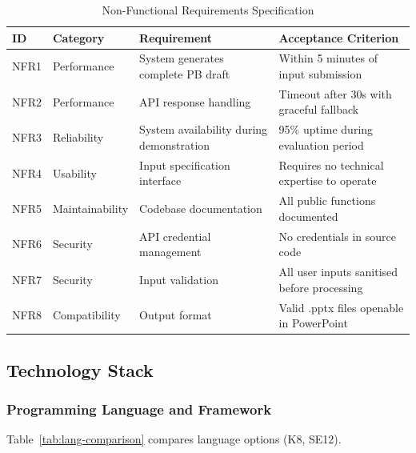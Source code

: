 \begin{table}[H]
\centering
\begin{tabular}{|l|l|l|l|}
\hline
\rowcolor{gray!20} \textbf{ID} & \textbf{Category} & \textbf{Requirement} & \textbf{Acceptance Criterion} \\
\hline
NFR1 & Performance & System generates complete PB draft & Within 5 minutes of input submission \\
\hline
NFR2 & Performance & API response handling & Timeout after 30s with graceful fallback \\
\hline
NFR3 & Reliability & System availability during demonstration & 95\% uptime during evaluation period \\
\hline
NFR4 & Usability & Input specification interface & Requires no technical expertise to operate \\
\hline
NFR5 & Maintainability & Codebase documentation & All public functions documented \\
\hline
NFR6 & Security & API credential management & No credentials in source code \\
\hline
NFR7 & Security & Input validation & All user inputs sanitised before processing \\
\hline
NFR8 & Compatibility & Output format & Valid .pptx files openable in PowerPoint \\
\hline
\end{tabular}
\caption{Non-Functional Requirements Specification}
\label{tab:nfr}
\end{table}

\subsection{Technology Stack}

\subsubsection{Programming Language and Framework}

Table~\ref{tab:lang-comparison} compares language options (K8, SE12).

